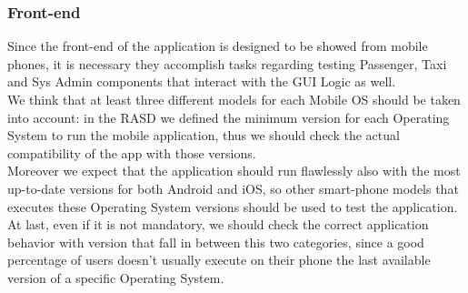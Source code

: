 \subsubsection{Front-end}
Since the front-end of the application is designed to be showed from mobile phones, it is necessary they accomplish tasks regarding testing Passenger, Taxi and Sys Admin components that interact with the GUI Logic as well. \\
We think that at least three different models for each Mobile OS should be taken into account: in the RASD we defined the minimum version for each Operating System to run the mobile application, thus we should check the actual compatibility of the app with those versions.\\
Moreover we expect that the application should run flawlessly also with the most up-to-date versions for both Android and iOS, so other smart-phone models that executes these Operating System versions should be used to test the application. \\ At last, even if it is not mandatory, we should check the correct application behavior with version that fall in between this two categories, since a good percentage of users doesn't usually execute on their phone the last available version of a specific Operating System.